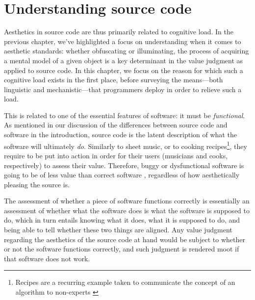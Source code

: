 \chapter{Understanding source code}

Aesthetics in source code are thus primarily related to cognitive load. In the previous chapter, we've highlighted a focus on understanding when it comes to aesthetic standards: whether obfuscating or illuminating, the process of acquiring a mental model of a given object is a key determinant in the value judgment as applied to source code. In this chapter, we focus on the reason for which such a cognitive load exists in the first place, before surveying the means—both linguistic and mechanistic—that programmers deploy in order to relieve such a load.

This is related to one of the essential features of software: it must be \emph{functional}. As mentioned in our discussion of the differences between source code and software in the introduction, source code is the latent description of what the software will ultimately \emph{do}. Similarly to sheet music, or to cooking recipes\footnote{Recipes are a recurring example taken to communicate the concept of an algorithm to non-experts \citep{zeller_algorithms_2020}}, they require to be put into action in order for their users (musicians and cooks, respectively) to assess their value. Therefore, buggy or dysfunctional software is going to be of less value than correct software \citep{hill_what_2016}, regardless of how aesthetically pleasing the source is.

The assessment of whether a piece of software functions correctly is essentially an assessment of whether what the software does is what the software is supposed to do, which in turn entails knowing what it does, what it is supposed to do, and being able to tell whether these two things are aligned. Any value judgment regarding the aesthetics of the source code at hand would be subject to whether or not the software functions correctly, and such judgment is rendered moot if that software does not work.

